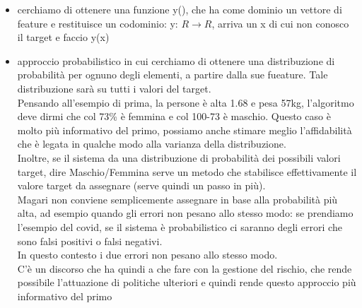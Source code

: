 \documentclass[12pt, oneside]{extbook}
\begin{document}
\begin{itemize}
	\item cerchiamo di ottenere una funzione y(), che ha come dominio un vettore di feature e restituisce un codominio: y: $R \rightarrow R$, arriva un x di cui non conosco il target e faccio y(x)
	\item approccio probabilistico in cui cerchiamo di ottenere una distribuzione di probabilità per ognuno degli elementi, a partire dalla sue fueature. Tale distribuzione sarà su tutti i valori del target.\\Pensando all'esempio di prima, la persone è alta 1.68 e pesa 57kg, l'algoritmo deve dirmi che col 73\% è femmina e col 100-73 è maschio. Questo caso è molto più informativo del primo, possiamo anche stimare meglio l'affidabilità che è legata in qualche modo alla varianza della distribuzione.\\Inoltre, se il sistema da una distribuzione di probabilità dei possibili valori target, dire Maschio/Femmina serve un metodo che stabilisce effettivamente il valore target da assegnare (serve quindi un passo in più).\\Magari non conviene semplicemente assegnare in base alla probabilità più alta, ad esempio quando gli errori non pesano allo stesso modo: se prendiamo l'esempio del covid, se il sistema è probabilistico ci saranno degli errori che sono falsi positivi o falsi negativi.\\In questo contesto i due errori non pesano allo stesso modo.\\C'è un discorso che ha quindi a che fare con la gestione del rischio, che rende possibile l'attuazione di politiche ulteriori e quindi rende questo approccio più informativo del primo
\end{itemize}
\end{document}
